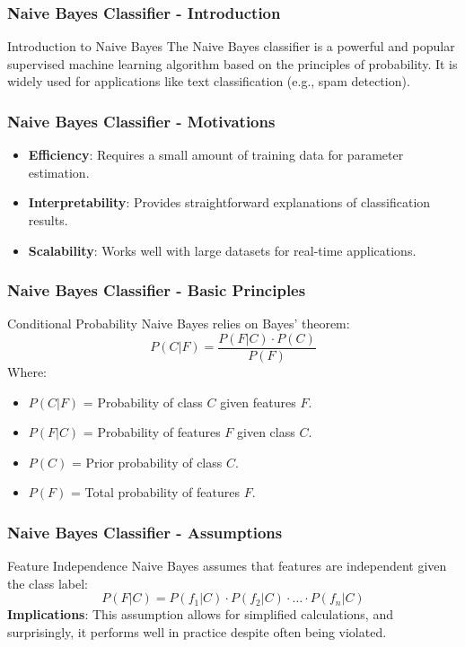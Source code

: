 \documentclass[aspectratio=169]{beamer}
\begin{document}
\begin{frame}[fragile]
    \frametitle{Naive Bayes Classifier - Introduction}
    \begin{block}{Introduction to Naive Bayes}
        The Naive Bayes classifier is a powerful and popular supervised machine learning algorithm based on the principles of probability. It is widely used for applications like text classification (e.g., spam detection).
    \end{block}
\end{frame}

\begin{frame}[fragile]
    \frametitle{Naive Bayes Classifier - Motivations}
    \begin{itemize}
        \item \textbf{Efficiency}: Requires a small amount of training data for parameter estimation.
        \item \textbf{Interpretability}: Provides straightforward explanations of classification results.
        \item \textbf{Scalability}: Works well with large datasets for real-time applications.
    \end{itemize}
\end{frame}

\begin{frame}[fragile]
    \frametitle{Naive Bayes Classifier - Basic Principles}
    \begin{block}{Conditional Probability}
        Naive Bayes relies on Bayes' theorem:
        \begin{equation}
            P(C | F) = \frac{P(F | C) \cdot P(C)}{P(F)}
        \end{equation}
        Where:
        \begin{itemize}
            \item \( P(C | F) \) = Probability of class \( C \) given features \( F \).
            \item \( P(F | C) \) = Probability of features \( F \) given class \( C \).
            \item \( P(C) \) = Prior probability of class \( C \).
            \item \( P(F) \) = Total probability of features \( F \).
        \end{itemize}
    \end{block}
\end{frame}

\begin{frame}[fragile]
    \frametitle{Naive Bayes Classifier - Assumptions}
    \begin{block}{Feature Independence}
        Naive Bayes assumes that features are independent given the class label:
        \begin{equation}
            P(F | C) = P(f_1 | C) \cdot P(f_2 | C) \cdot \ldots \cdot P(f_n | C)
        \end{equation}
        \textbf{Implications}: This assumption allows for simplified calculations, and surprisingly, it performs well in practice despite often being violated.
    \end{block}
\end{frame}
\end{document}
